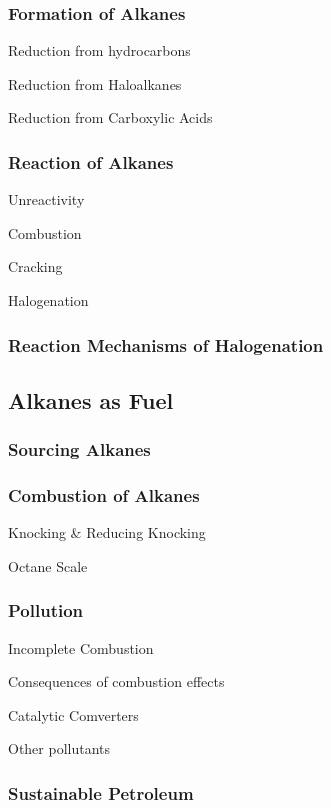 \documentclass[../main]{subfiles}
\begin{document}
\subsubsection{Formation of Alkanes}

Reduction from hydrocarbons

Reduction from Haloalkanes

Reduction from Carboxylic Acids

\subsubsection{Reaction of Alkanes}

Unreactivity

Combustion

Cracking

Halogenation

\subsubsection{Reaction Mechanisms of Halogenation}

\subsection{Alkanes as Fuel}

\subsubsection{Sourcing Alkanes}

\subsubsection{Combustion of Alkanes}

Knocking & Reducing Knocking

Octane Scale

\subsubsection{Pollution}

Incomplete Combustion

Consequences of combustion effects

Catalytic Comverters

Other pollutants

\subsubsection{Sustainable Petroleum}
\end{document}
